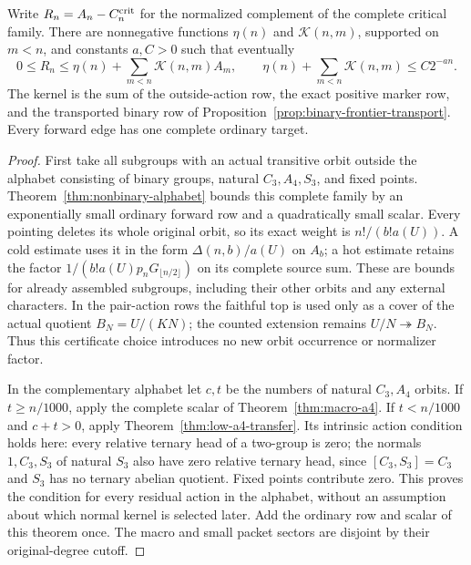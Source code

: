 \begin{theorem}
\label{thm:global-counting}
Write $R_n=A_n-C_n^{\mathrm{crit}}$ for the normalized complement of the
complete critical family. There are nonnegative functions $\eta(n)$
and $\mathcal K(n,m)$, supported on $m<n$, and constants $a,C>0$
such that eventually
\begin{equation}\label{eq:master}
 0\leq R_n\leq\eta(n)+\sum_{m<n}\mathcal K(n,m)A_m,
 \qquad
 \eta(n)+\sum_{m<n}\mathcal K(n,m)\leq C2^{-an}.
\end{equation}
The kernel is the sum of the outside-action row, the exact positive
marker row, and the transported binary row of
Proposition~\ref{prop:binary-frontier-transport}. Every forward edge
has one complete ordinary target.
\end{theorem}
\begin{proof}
First take all subgroups with an actual transitive orbit outside
the alphabet consisting of binary groups, natural $C_3,A_4,S_3$,
and fixed points. Theorem~\ref{thm:nonbinary-alphabet} bounds this
complete family by an exponentially small ordinary forward row
and a quadratically small scalar. Every pointing deletes its whole
original orbit, so its exact weight is
$n!/(b!a(U))$. A cold estimate uses it in the form
$\Delta(n,b)/a(U)$ on $A_b$; a hot estimate retains the factor
$1/(b!a(U)p_nG_{\lfloor n/2\rfloor})$ on its complete source sum.
These are bounds for already assembled subgroups, including their
other orbits and any external characters.
In the pair-action rows the faithful top is used only as a cover of the
actual quotient $B_N=U/(KN)$; the counted extension remains
$U/N\twoheadrightarrow B_N$. Thus this certificate choice introduces no
new orbit occurrence or normalizer factor.

In the complementary alphabet let $c,t$ be the numbers of natural
$C_3,A_4$ orbits. If $t\geq n/1000$, apply the complete scalar
of Theorem~\ref{thm:macro-a4}. If $t<n/1000$ and $c+t>0$, apply
Theorem~\ref{thm:low-a4-transfer}. Its intrinsic action condition
holds here: every relative ternary head of a two-group is zero;
the normals $1,C_3,S_3$ of natural $S_3$ also have zero relative
ternary head, since $[C_3,S_3]=C_3$ and $S_3$ has no ternary
abelian quotient. Fixed points contribute zero. This proves the
condition for every residual action in the alphabet, without an
assumption about which normal kernel is selected later. Add the
ordinary row and scalar of this theorem once. The macro and small
packet sectors are disjoint by their original-degree cutoff.


\end{proof}
